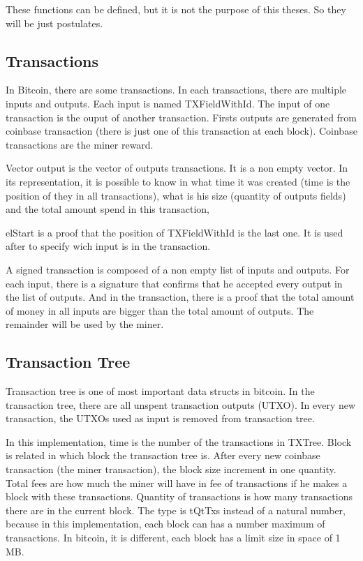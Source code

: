 \documentclass[12pt]{article}
\begin{document}
These functions can be defined, but it is not the purpose of this theses.
So they will be just postulates.


\subsection{Transactions}

In Bitcoin, there are some transactions.
In each transactions, there are multiple inputs and outputs.
Each input is named TXFieldWithId.
The input of one transaction is the ouput of another transaction.
Firsts outputs are generated from coinbase transaction (there is just one of this transaction at each block).
Coinbase transactions are the miner reward.


Vector output is the vector of outputs transactions.
It is a non empty vector.
In its representation, it is possible to know in what time it was created (time is the position of they in all transactions),
what is his size (quantity of outputs fields)
and the total amount spend in this transaction,

elStart is a proof that the position of TXFieldWithId is the last one.
It is used after to specify wich input is in the transaction.


A signed transaction is composed of a non empty list of inputs and outputs.
For each input, there is a signature that confirms that he accepted every output in the list of outputs.
And in the transaction, there is a proof that the total amount of money in all inputs are bigger than
the total amount of outputs.
The remainder will be used by the miner.

\subsection{Transaction Tree}

Transaction tree is one of most important data structs in bitcoin.
In the transaction tree, there are all unspent transaction outputs (UTXO).
In every new transaction, the UTXOs used as input is removed from transaction tree.


In this implementation, time is the number of the transactions in TXTree.
Block is related in which block the transaction tree is.
After every new coinbase transaction (the miner transaction), the block size increment in one quantity.
Total fees are how much the miner will have in fee of transactions if he makes a block with these transactions.
Quantity of transactions is how many transactions there are in the current block.
The type is tQtTxs instead of a natural number, because in this implementation, each block can has a number maximum of transactions.
In bitcoin, it is different, each block has a limit size in space of 1 MB.
\end{document}
